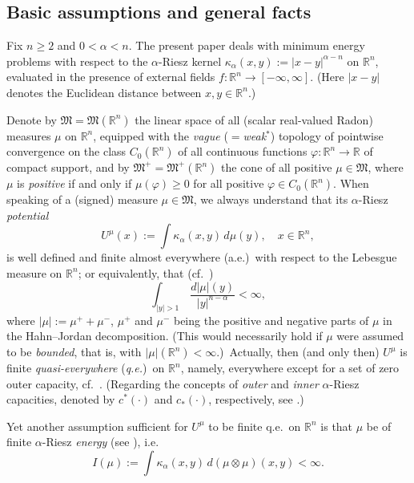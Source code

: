 \documentclass[12pt,a4paper,reqno]{amsart} %
\theoremstyle{lause}
\theoremstyle{maaritelma}
\theoremstyle{lause}
\theoremstyle{maaritelma}
\numberwithin{equation}{section}
\begin{document}
\subsection{Basic assumptions and general facts}\label{sec-gen} Fix $n\geqslant2$ and $0<\alpha<n$. The present paper deals with minimum energy problems with respect to the $\alpha$-Riesz kernel $\kappa_\alpha(x,y):=|x-y|^{\alpha-n}$ on $\mathbb R^n$, evaluated in the presence of external fields $f:\mathbb R^n\to[-\infty,\infty]$. (Here $|x-y|$ denotes the Euclidean distance between $x,y\in\mathbb R^n$.)

Denote by $\mathfrak M=\mathfrak M(\mathbb R^n)$ the linear space of all (scalar real-valued Radon) measures $\mu$ on $\mathbb R^n$, equipped with the {\it vague} ({\it $=$\/weak\/$^*$}) topology of pointwise convergence on the class $C_0(\mathbb R^n)$ of all continuous functions $\varphi:\mathbb R^n\to\mathbb R$ of compact support, and by $\mathfrak M^+=\mathfrak M^+(\mathbb R^n)$ the cone of all positive $\mu\in\mathfrak M$, where $\mu$ is {\it positive} if and only if $\mu(\varphi)\geqslant0$ for all positive $\varphi\in C_0(\mathbb R^n)$. When speaking of a (signed) measure $\mu\in\mathfrak M$, we always understand that its $\alpha$-Riesz {\it potential}
\[U^\mu(x):=\int\kappa_\alpha(x,y)\,d\mu(y),\quad x\in\mathbb R^n,\]
is well defined and finite almost everywhere (a.e.)\ with respect to the Lebesgue measure on $\mathbb R^n$; or equivalently, that (cf.\ \cite[Section~I.3.7]{L})
\begin{equation}\label{1.3.10}
\int_{|y|>1}\,\frac{d|\mu|(y)}{|y|^{n-\alpha}}<\infty,
\end{equation}
where $|\mu|:=\mu^++\mu^-$, $\mu^+$ and $\mu^-$ being the positive and negative parts of $\mu$ in the Hahn--Jor\-dan decomposition. (This would necessarily hold if $\mu$ were assumed to be {\it bounded}, that is, with $|\mu|(\mathbb R^n)<\infty$.)\ Actually, then (and only then) $U^\mu$ is finite {\it quasi-everywhere} ({\it q.e.})\ on $\mathbb R^n$, namely, everywhere except for a set of zero outer capacity, cf.\ \cite[Section~III.1.1]{L}. (Regarding the concepts of {\it outer} and {\it inner} $\alpha$-Riesz capacities, denoted by $c^*(\cdot)$ and $c_*(\cdot)$, respectively, see \cite[Section~II.2.6]{L}.)

Yet another assumption sufficient for $U^\mu$ to be finite q.e.\ on $\mathbb R^n$ is that $\mu$ be of finite $\alpha$-Riesz {\it energy} (see \cite[Corollary to Lemma~3.2.3]{F1}), i.e.
\[I(\mu):=\int\kappa_\alpha(x,y)\,d(\mu\otimes\mu)(x,y)<\infty.\]
\end{document}

